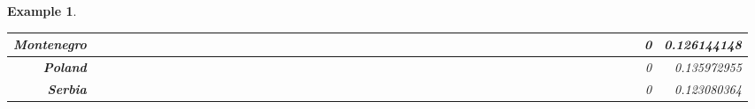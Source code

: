 \documentclass[a4paper,11pt]{report}
\newtheorem{example}[theorem]{Example}
\begin{document}
\begin{example}
\begin{appendices}
\begin{landscape}
\begin{longtable}{r|r|r|r|r|r|r|r|r|r|r|r|r|r|r|r|r|r|r|r|r|r|r|r|r|r|r|r|r|r|r|r|r|r|r|r|r|r|r|r|r|r|r|r|r|r|r|}
\multicolumn{1}{|r|}{\textbf{Montenegro}}            &                  &                  &                  &                     &                  &                  &                                &                   &                  &                 &                         &                  &                  &                           &                  &                 &                  &                 &                  &                  &                  &                 &                 &                    &                &                  &                     &                 &                 &                   &                  &                 &                 &                   &                   &                &                 &                      &                          &                 &                  &                         &                 &                & 0                        & 0.126144148        \\ \hline
\multicolumn{1}{|r|}{\textbf{Poland}}                &                  &                  &                  &                     &                  &                  &                                &                   &                  &                 &                         &                  &                  &                           &                  &                 &                  &                 &                  &                  &                  &                 &                 &                    &                &                  &                     &                 &                 &                   &                  &                 &                 &                   &                   &                &                 &                      &                          &                 &                  &                         &                 &                & 0                        & 0.135972955        \\ \hline
\multicolumn{1}{|r|}{\textbf{Serbia}}                &                  &                  &                  &                     &                  &                  &                                &                   &                  &                 &                         &                  &                  &                           &                  &                 &                  &                 &                  &                  &                  &                 &                 &                    &                &                  &                     &                 &                 &                   &                  &                 &                 &                   &                   &                &                 &                      &                          &                 &                  &                         &                 &                & 0                        & 0.123080364        \\ \hline

\end{longtable}
\end{landscape}
\end{appendices}
\end{example}
\end{document}
